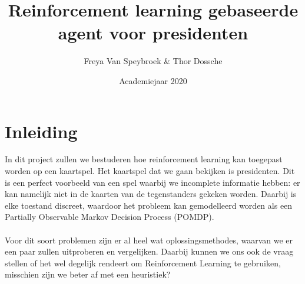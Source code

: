 \documentclass[11pt]{article}
\begin{document}
\begin{titlepage}
\title{Reinforcement learning gebaseerde agent voor presidenten}
\author{Freya Van Speybroek \& Thor Dossche}
\date{Academiejaar 2020 }
\maketitle
\thispagestyle{empty}
\end{titlepage}


\section{Inleiding}
In dit project zullen we bestuderen hoe reinforcement learning kan toegepast worden op een kaartspel. Het kaartspel dat we gaan bekijken is presidenten. Dit is een perfect voorbeeld van een spel waarbij we incomplete informatie hebben: er kan namelijk niet in de kaarten van de tegenstanders gekeken worden. Daarbij is elke toestand discreet, waardoor het probleem kan gemodelleerd worden als een Partially Observable Markov Decision Process (POMDP).\\\\
Voor dit soort problemen zijn er al heel wat oplossingsmethodes, waarvan we er een paar zullen uitproberen en vergelijken. Daarbij kunnen we ons ook de vraag stellen of het wel degelijk rendeert om Reinforcement Learning te gebruiken, misschien zijn we beter af met een heuristiek? 
\end{document}
